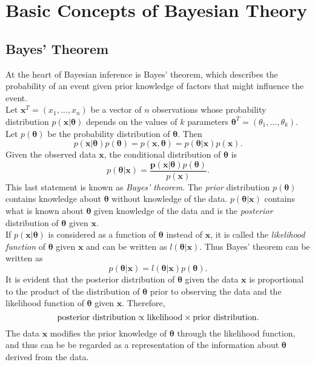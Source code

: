 \documentclass[12pt]{book}
\begin{document}
\section{Basic Concepts of Bayesian Theory}
\subsection{Bayes' Theorem}
At the heart of Bayesian inference is Bayes' theorem, which describes the probability of an event given prior knowledge of factors that might influence the event. \\
Let $\pmb{x}^T=\left(x_1,...,x_n\right)$ be a vector of $n$ observations whose probability distribution $p\left(\pmb{x}|\pmb{\theta}\right)$ depends on the values of $k$ parameters $\pmb{\theta}^T=\left(\theta_1,...,\theta_k\right)$. Let $p\left(\pmb{\theta}\right)$ be the probability distribution of $\pmb{\pmb{\theta}}$. Then 
\begin{equation}
    p\left(\pmb{x}|\pmb{\theta}\right)p\left(\pmb{\theta}\right)=p\left(\pmb{x},\pmb{\theta}\right) = p\left(\pmb{\theta}|\pmb{x}\right)p\left(\pmb{x}\right).
\end{equation}
Given the observed data $\pmb{x}$, the conditional distribution of $\pmb{\theta}$ is
\begin{equation}
    p\left(\pmb{\theta}|\pmb{x}\right)=\frac{\pmb{p}\left(\pmb{x}|\pmb{\theta}\right)p\left(\pmb{\theta}\right)}{p\left(\pmb{x}\right)}.
\end{equation}
This last statement is known as \textit{Bayes' theorem}. The \textit{prior} distribution $p\left(\pmb{\theta}\right)$ contains knowledge about $\pmb{\theta}$ without knowledge of the data. $p\left(\pmb{\theta}|\pmb{x}\right)$ contains what is known about $\pmb{\theta}$ given knowledge of the data and is the \textit{posterior} distribution of $\pmb{\theta}$ given $\pmb{x}$. \\
If $p\left(\pmb{x}|\pmb{\theta}\right)$ is considered as a function of $\pmb{\theta}$ instead of $\pmb{x}$, it is called the \textit{likelihood function} of $\pmb{\theta}$ given $\pmb{x}$ and can be written as $l\left(\pmb{\theta}|\pmb{x}\right)$. Thus Bayes' theorem can be written as
\begin{equation}
    p\left(\pmb{\theta}|\pmb{x}\right)=l\left(\pmb{\theta}|\pmb{x}\right)p\left(\pmb{\theta}\right).
\end{equation}
It is evident that the posterior distribution of $\pmb{\theta}$ given the data $\pmb{x}$ is proportional to the product of the distribution of $\pmb{\theta}$ prior to observing the data and the likelihood function of $\pmb{\theta}$ given $\pmb{x}$. Therefore,
\begin{equation*}
    \hbox{posterior distribution} \propto  \hbox{likelihood}\times\hbox{prior distribution}.
\end{equation*}
The data $\pmb{x}$ modifies the prior knowledge of $\pmb{\theta}$ through the likelihood function, and thus can be be regarded as a representation of the information about  $\pmb{\theta}$ derived from the data\autocite[Cf.][]{box2011bayesian}.
\end{document}
